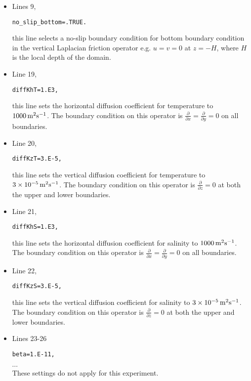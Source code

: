 \begin{itemize}
\item Lines 9,
\begin{verbatim}
no_slip_bottom=.TRUE.
\end{verbatim}
this line selects a no-slip boundary condition for bottom
boundary condition in the vertical Laplacian friction operator 
e.g. $u=v=0$ at $z=-H$, where $H$ is the local depth of the domain.

\item Line 19,
\begin{verbatim}
diffKhT=1.E3,
\end{verbatim}
this line sets the horizontal diffusion coefficient for temperature
to $1000\,{\rm m^{2}s^{-1}}$. The boundary condition on this
operator is $\frac{\partial}{\partial x}=\frac{\partial}{\partial y}=0$ on
all boundaries.

\item Line 20,
\begin{verbatim}
diffKzT=3.E-5,
\end{verbatim}
this line sets the vertical diffusion coefficient for temperature
to $3 \times 10^{-5}\,{\rm m^{2}s^{-1}}$. The boundary 
condition on this operator is $\frac{\partial}{\partial z}=0$ at both
the upper and lower boundaries.

\item Line 21,
\begin{verbatim}
diffKhS=1.E3,
\end{verbatim}
this line sets the horizontal diffusion coefficient for salinity
to $1000\,{\rm m^{2}s^{-1}}$. The boundary condition on this
operator is $\frac{\partial}{\partial x}=\frac{\partial}{\partial y}=0$ on
all boundaries.

\item Line 22,
\begin{verbatim}
diffKzS=3.E-5,
\end{verbatim}
this line sets the vertical diffusion coefficient for salinity
to $3 \times 10^{-5}\,{\rm m^{2}s^{-1}}$. The boundary 
condition on this operator is $\frac{\partial}{\partial z}=0$ at both
the upper and lower boundaries.

\item Lines 23-26
\begin{verbatim}
beta=1.E-11,
\end{verbatim}
\vspace{-5mm}$\cdots$\\
These settings do not apply for this experiment.


\end{itemize}
